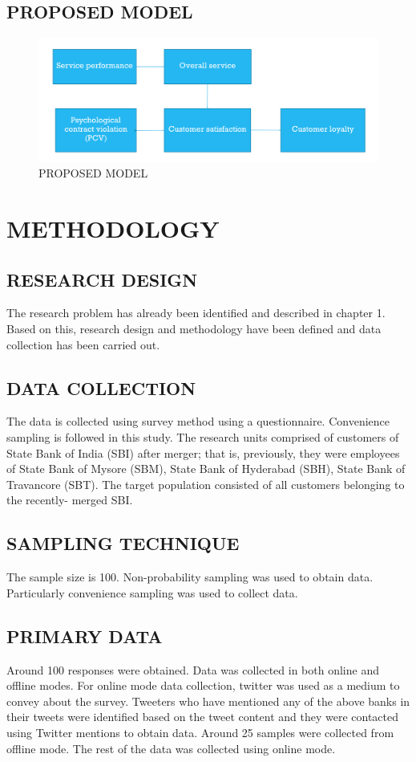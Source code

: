\documentclass[a4paper, 12pt]{extarticle}
\begin{document}
{\subsection{PROPOSED MODEL}
\begin{figure}[H]
\centering
\includegraphics[scale=0.5]{model.png}
\caption {PROPOSED MODEL}
\end{figure}

\newpage

\section{METHODOLOGY}
\subsection{RESEARCH DESIGN}
The research problem has already been identified and described in chapter 1. Based on this, research design and methodology have been defined and data collection has been carried out.

\subsection{DATA COLLECTION}
\par The data is collected using survey method using a questionnaire. Convenience sampling is followed in this study. The research units comprised of customers of State Bank of India (SBI) after merger; that is, previously, they were employees of State Bank of Mysore (SBM), State Bank of Hyderabad (SBH), State Bank of Travancore (SBT). The target population consisted of all customers belonging to the recently- merged SBI.
\subsection{SAMPLING TECHNIQUE}
The sample size is 100. Non-probability sampling was used to obtain data. Particularly convenience sampling was used to collect data.
\subsection{PRIMARY DATA}
\par Around 100 responses were obtained. Data was collected in both online and offline modes. For online mode data collection, twitter was used as a medium to convey about the survey. Tweeters who have mentioned any of the above banks in their tweets were identified based on the tweet content and they were contacted using Twitter mentions to obtain data. Around 25 samples were collected from offline mode. The rest of the data was collected using online mode.
}
\end{document}
